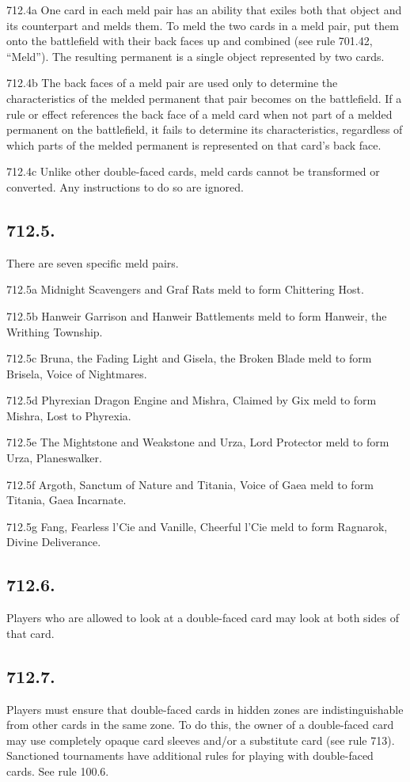 712.4a One card in each meld pair has an ability that exiles both that object and its counterpart and melds them. To meld the two cards in a meld pair, put them onto the battlefield with their back faces up and combined (see rule 701.42, “Meld”). The resulting permanent is a single object represented by two cards.

712.4b The back faces of a meld pair are used only to determine the characteristics of the melded permanent that pair becomes on the battlefield. If a rule or effect references the back face of a meld card when not part of a melded permanent on the battlefield, it fails to determine its characteristics, regardless of which parts of the melded permanent is represented on that card’s back face.

712.4c Unlike other double-faced cards, meld cards cannot be transformed or converted. Any instructions to do so are ignored.

\subsection*{712.5.}
There are seven specific meld pairs.

712.5a Midnight Scavengers and Graf Rats meld to form Chittering Host.

712.5b Hanweir Garrison and Hanweir Battlements meld to form Hanweir, the Writhing Township.

712.5c Bruna, the Fading Light and Gisela, the Broken Blade meld to form Brisela, Voice of Nightmares.

712.5d Phyrexian Dragon Engine and Mishra, Claimed by Gix meld to form Mishra, Lost to Phyrexia.

712.5e The Mightstone and Weakstone and Urza, Lord Protector meld to form Urza, Planeswalker.

712.5f Argoth, Sanctum of Nature and Titania, Voice of Gaea meld to form Titania, Gaea Incarnate.

712.5g Fang, Fearless l’Cie and Vanille, Cheerful l’Cie meld to form Ragnarok, Divine Deliverance.

\subsection*{712.6.}
Players who are allowed to look at a double-faced card may look at both sides of that card.

\subsection*{712.7.}
Players must ensure that double-faced cards in hidden zones are indistinguishable from other cards in the same zone. To do this, the owner of a double-faced card may use completely opaque card sleeves and/or a substitute card (see rule 713). Sanctioned tournaments have additional rules for playing with double-faced cards. See rule 100.6.

